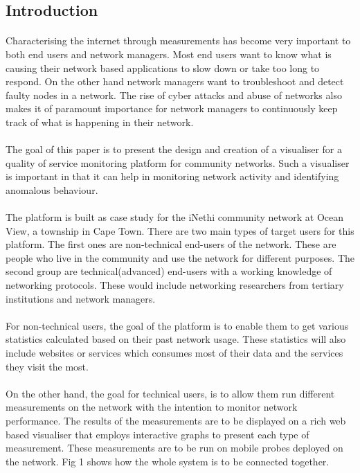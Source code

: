 \subsection{Introduction}
\paragraph{}
Characterising the internet through measurements has become very important to both end users and network
managers. Most end users want to know what is causing their network based applications to slow down or take too long to respond. On the other hand network managers want to troubleshoot and detect faulty nodes in a network. The rise of cyber attacks and abuse of networks also makes it of paramount importance for network managers to continuously keep track of what is happening in their network.
\paragraph{}
The goal of this paper is to present the design and creation of a visualiser for a quality of service monitoring platform for community networks. Such a visualiser is important in that it can help in monitoring network activity and identifying anomalous behaviour.
\paragraph{}
The platform is built as case study for the iNethi community network at Ocean View, a township in Cape Town. There are two main types of target users for this platform. The first ones are non-technical end-users of the network. These are people who live in the community and use the network for different purposes. The second group are technical(advanced) end-users with a working knowledge of networking protocols. These would include networking researchers from tertiary institutions and network managers.
\paragraph{}
For non-technical users, the goal of the platform is to enable them to get various statistics calculated based on their past network usage. These statistics will also include websites or services which consumes most of their data and the services they visit the most.
\paragraph{}
On the other hand, the goal for technical users, is to allow them run different measurements on the network with the intention to monitor network performance. The results of the measurements are to be displayed on a rich web based visualiser that employs interactive graphs to present each type of measurement. These measurements are to be run on mobile probes deployed on the network. Fig 1 shows how the whole system is to be connected together.

